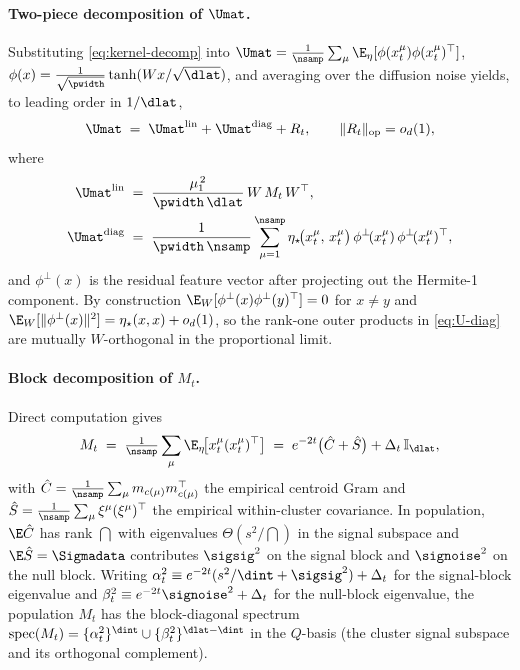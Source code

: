 \paragraph{Two-piece decomposition of $\Umat$.}
Substituting \eqref{eq:kernel-decomp} into
$\Umat = \tfrac{1}{\nsamp}\sum_\mu \E_\eta[\phi(x_t^\mu)\phi(x_t^\mu)^\top]$,
$\phi(x) = \tfrac{1}{\sqrt{\pwidth}}\tanh(Wx/\sqrt{\dlat})$, and
averaging over the diffusion noise yields, to leading order in $1/\dlat$,
\begin{equation}
  \Umat \;=\; \Umat^{\mathrm{lin}} + \Umat^{\mathrm{diag}} + R_t,
  \qquad \|R_t\|_{\mathrm{op}} = o_d(1),
  \label{eq:U-split}
\end{equation}
where
\begin{align}
  \Umat^{\mathrm{lin}}
    \;&=\; \frac{\mu_1^{\,2}}{\pwidth\,\dlat}\,W\,M_t\,W^\top,
    \label{eq:U-lin}\\
  \Umat^{\mathrm{diag}}
    \;&=\; \frac{1}{\pwidth\,\nsamp}\sum_{\mu=1}^{\nsamp}
           \eta_\star\!\bigl(x_t^\mu,\,x_t^\mu\bigr)\,
           \phi^{\perp}\!(x_t^\mu)\,\phi^{\perp}\!(x_t^\mu)^\top,
    \label{eq:U-diag}
\end{align}
and $\phi^\perp(x)$ is the residual feature vector after projecting
out the Hermite-1 component. By construction
$\E_W[\phi^\perp(x)\phi^\perp(y)^\top] = 0$ for $x\neq y$ and
$\E_W[\|\phi^\perp(x)\|^2] = \eta_\star(x,x)+o_d(1)$, so the rank-one
outer products in \eqref{eq:U-diag} are mutually $W$-orthogonal in
the proportional limit.

\paragraph{Block decomposition of $M_t$.}
Direct computation gives
\begin{equation}
  M_t \;=\; \tfrac{1}{\nsamp}\sum_\mu \E_\eta\!\bigl[x_t^\mu(x_t^\mu)^\top\bigr]
        \;=\; e^{-2t}\bigl(\hat C + \hat S\bigr) + \Delta_t\,\mathbb{I}_{\dlat},
  \label{eq:Mt}
\end{equation}
with $\hat C = \tfrac{1}{\nsamp}\sum_\mu m_{c(\mu)}m_{c(\mu)}^\top$ the
empirical centroid Gram and $\hat S = \tfrac{1}{\nsamp}\sum_\mu
\xi^\mu(\xi^\mu)^\top$ the empirical within-cluster covariance.
In population, $\E\hat C$ has rank $\dint$ with eigenvalues
$\Theta(s^2/\dint)$ in the signal subspace and $\E\hat S = \Sigmadata$
contributes $\sigsig^2$ on the signal block and $\signoise^2$ on the
null block. Writing $\alpha_t^2 \equiv e^{-2t}(s^2/\dint + \sigsig^2) + \Delta_t$
for the signal-block eigenvalue and $\beta_t^2 \equiv e^{-2t}\signoise^2 + \Delta_t$
for the null-block eigenvalue, the population $M_t$ has the block-diagonal
spectrum
\(\mathrm{spec}(M_t) = \{\alpha_t^2\}^{\dint} \cup \{\beta_t^2\}^{\dlat-\dint}\)
in the $Q$-basis (the cluster signal subspace and its orthogonal
complement).

